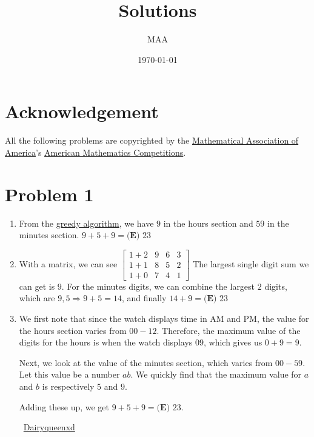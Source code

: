 \documentclass{article}%
\title{Solutions}%
\author{MAA}%
\date{\today}%
\begin{document}
%
\normalsize%
\maketitle%
\section*{Acknowledgement}%
\label{sec:Acknowledgement}%
All the following problems are copyrighted by the \href{https://www.maa.org/}{Mathematical Association of America}'s \href{https://www.maa.org/math-competitions}{American Mathematics Competitions}.

%
\clearpage%
\section*{Problem 1}%
\label{sec:Problem1}%
\begin{enumerate}%
\item%
From the \href{/wiki/index.php/Greedy_algorithm}{greedy algorithm}, we have $9$ in the hours section and $59$ in the minutes section. $9+5+9=\boxed{\textbf{(E) }23}$

%
\item%
With a matrix, we can see
$\begin{bmatrix} 1+2&9&6&3\\ 1+1&8&5&2\\ 1+0&7&4&1 \end{bmatrix}$
The largest single digit sum we can get is $9$.
For the minutes digits, we can combine the largest $2$ digits, which are $9,5 \Rightarrow 9+5=14$, and finally $14+9=\boxed{\textbf{(E) }23}$

%
\item%
We first note that since the watch displays time in AM and PM, the value for the hours section varies from $00-12$. Therefore, the maximum value of the digits for the hours is when the watch displays $09$, which gives us $0+9=9$.

Next, we look at the value of the minutes section, which varies from $00-59$. Let this value be a number $ab$. We quickly find that the maximum value for $a$ and $b$ is respectively $5$ and $9$.

Adding these up, we get $9+5+9=\boxed{\textbf{(E) }23}$.

~\href{/wiki/index.php/User:Dairyqueenxd}{Dairyqueenxd}

%
\end{enumerate}

%
\end{document}
